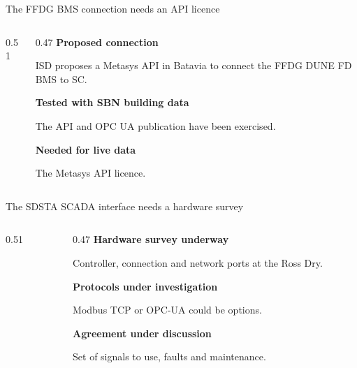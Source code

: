 \documentclass[aspectratio=169,11pt]{beamer}
\begin{document}
\begin{frame}{The FFDG BMS connection needs an API licence}
\begin{columns}[T,onlytextwidth]
\begin{column}{0.51\textwidth}
\centering\siteboundarymap
\end{column}
\begin{column}{0.47\textwidth}
\textbf{Proposed connection}\par
ISD proposes a Metasys API in Batavia to connect the FFDG DUNE FD BMS to SC.\par\bigskip
\textbf{Tested with SBN building data}\par
The API and OPC UA publication have been exercised.\par\bigskip
\textbf{Needed for live data}\par
The Metasys API licence.
\end{column}
\end{columns}\par\bigskip
\raggedright{}
\end{frame}

\DpsFfdgUpdate

\begin{frame}{The SDSTA SCADA interface needs a hardware survey}
\begin{columns}[T,onlytextwidth]
\begin{column}{0.51\textwidth}
\centering\siteboundarymap
\end{column}
\begin{column}{0.47\textwidth}
\textbf{Hardware survey underway}\par
Controller, connection and network ports at the Ross Dry.\par\bigskip
\textbf{Protocols under investigation}\par
Modbus TCP or OPC-UA could be options.\par\bigskip
\textbf{Agreement under discussion}\par
Set of signals to use, faults and maintenance.
\end{column}
\end{columns}\par\bigskip
\raggedright{}
\end{frame}

\DpsSdstaUpdate
\end{document}
